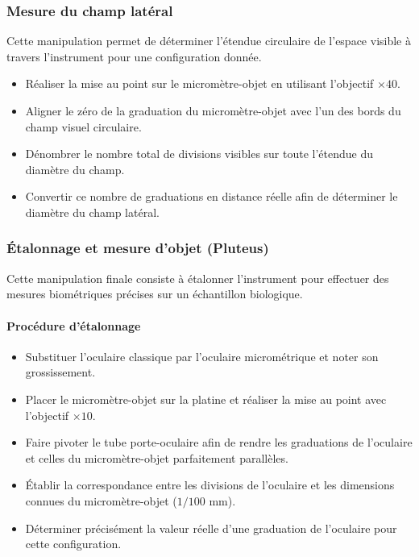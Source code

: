 \subsubsection{Mesure du champ latéral}

Cette manipulation permet de déterminer l'étendue circulaire de l'espace visible à travers l'instrument pour une configuration donnée.

\begin{itemize}
    \item Réaliser la mise au point sur le micromètre-objet en utilisant l'objectif $\times 40$.
    \item Aligner le zéro de la graduation du micromètre-objet avec l'un des bords du champ visuel circulaire.
    \item Dénombrer le nombre total de divisions visibles sur toute l'étendue du diamètre du champ.
    \item Convertir ce nombre de graduations en distance réelle afin de déterminer le diamètre du champ latéral.
\end{itemize}

\subsubsection{Étalonnage et mesure d'objet (Pluteus)}

Cette manipulation finale consiste à étalonner l'instrument pour effectuer des mesures biométriques précises sur un échantillon biologique.

\paragraph{Procédure d'étalonnage}
\begin{itemize}
    \item Substituer l'oculaire classique par l'oculaire micrométrique et noter son grossissement.
    \item Placer le micromètre-objet sur la platine et réaliser la mise au point avec l'objectif $\times 10$.
    \item Faire pivoter le tube porte-oculaire afin de rendre les graduations de l'oculaire et celles du micromètre-objet parfaitement parallèles.
    \item Établir la correspondance entre les divisions de l'oculaire et les dimensions connues du micromètre-objet ($1/100$ mm).
    \item Déterminer précisément la valeur réelle d'une graduation de l'oculaire pour cette configuration.
\end{itemize}

